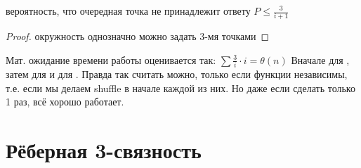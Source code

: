 \begin{lemma}
вероятность, что очередная точка не принадлежит ответу $P \leq \frac{3}{i+1}$
\end{lemma}

\begin{proof}
окружность однозначно можно задать 3-мя точками
\end{proof}

Мат. ожидание времени работы оценивается так: $\sum \frac{3}{i} \cdot i = \theta(n)$
Вначале для , затем для  и для .
Правда так считать можно, только если функции независимы, т.е. если
мы делаем shuffle в начале каждой из них. Но даже если сделать только 1 раз,
всё хорошо работает.

\section{Рёберная 3-связность}

\TODO














